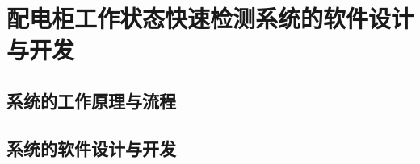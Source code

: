 \begin{conclusion}
\label{配电柜工作状态快速检测的软件设计与开发}
\chapter{配电柜工作状态快速检测系统的软件设计与开发}
\section{系统的工作原理与流程}
\section{系统的软件设计与开发}
\end{conclusion}


